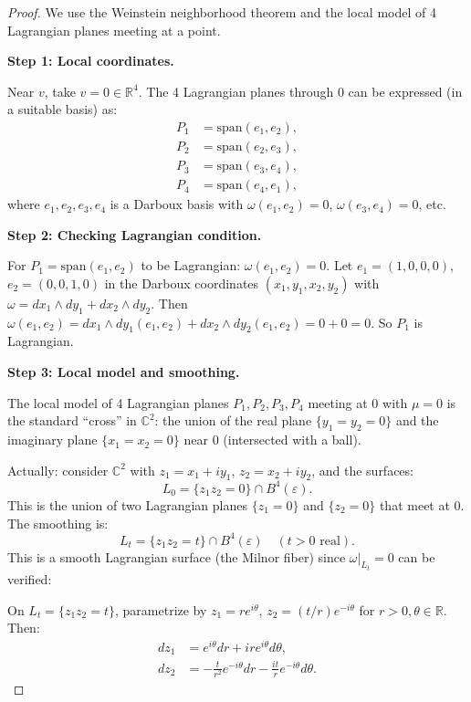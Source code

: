 \documentclass[12pt]{article}
\begin{document}
\begin{proof}
We use the Weinstein neighborhood theorem and the local model of 4 Lagrangian planes meeting at a point.

\textbf{Step 1: Local coordinates.}

Near $v$, take $v = 0 \in \mathbb{R}^4$. The 4 Lagrangian planes through $0$ can be expressed (in a suitable basis) as:
\begin{align*}
P_1 &= \mathrm{span}(e_1, e_2), \\
P_2 &= \mathrm{span}(e_2, e_3), \\
P_3 &= \mathrm{span}(e_3, e_4), \\
P_4 &= \mathrm{span}(e_4, e_1),
\end{align*}
where $e_1, e_2, e_3, e_4$ is a Darboux basis with $\omega(e_1, e_2) = 0$, $\omega(e_3, e_4) = 0$, etc.

\textbf{Step 2: Checking Lagrangian condition.}

For $P_1 = \mathrm{span}(e_1, e_2)$ to be Lagrangian: $\omega(e_1, e_2) = 0$. Let $e_1 = (1,0,0,0)$, $e_2 = (0,0,1,0)$ in the Darboux coordinates $(x_1, y_1, x_2, y_2)$ with $\omega = dx_1 \wedge dy_1 + dx_2 \wedge dy_2$. Then $\omega(e_1, e_2) = dx_1 \wedge dy_1(e_1, e_2) + dx_2 \wedge dy_2(e_1, e_2) = 0 + 0 = 0$. So $P_1$ is Lagrangian.

\textbf{Step 3: Local model and smoothing.}

The local model of 4 Lagrangian planes $P_1, P_2, P_3, P_4$ meeting at 0 with $\mu = 0$ is the standard ``cross'' in $\mathbb{C}^2$: the union of the real plane $\{y_1 = y_2 = 0\}$ and the imaginary plane $\{x_1 = x_2 = 0\}$ near 0 (intersected with a ball).

Actually: consider $\mathbb{C}^2$ with $z_1 = x_1 + iy_1$, $z_2 = x_2 + iy_2$, and the surfaces:
\[
L_0 = \{z_1 z_2 = 0\} \cap B^4(\varepsilon).
\]
This is the union of two Lagrangian planes $\{z_1 = 0\}$ and $\{z_2 = 0\}$ that meet at 0. The smoothing is:
\[
L_t = \{z_1 z_2 = t\} \cap B^4(\varepsilon) \quad (t > 0 \text{ real}).
\]
This is a smooth Lagrangian surface (the Milnor fiber) since $\omega|_{L_t} = 0$ can be verified:

On $L_t = \{z_1 z_2 = t\}$, parametrize by $z_1 = re^{i\theta}$, $z_2 = (t/r)e^{-i\theta}$ for $r > 0, \theta \in \mathbb{R}$. Then:
\begin{align*}
dz_1 &= e^{i\theta}dr + ire^{i\theta}d\theta, \\
dz_2 &= -\frac{t}{r^2}e^{-i\theta}dr - \frac{it}{r}e^{-i\theta}d\theta.
\end{align*}


\end{proof}
\end{document}
